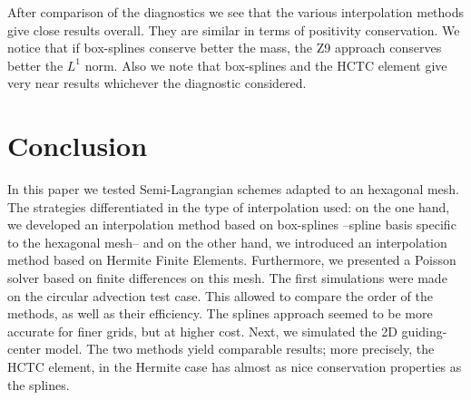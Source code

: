 \documentclass[proc]{edpsmath}
\begin{document}
After comparison of the diagnostics we see that the various interpolation methods give close results overall. They are similar in terms of positivity conservation. We notice that if box-splines conserve better the mass, the Z9 approach conserves better the $L^1$ norm. Also we note that box-splines and the HCTC element give very near results whichever the diagnostic considered.  


\section{Conclusion}
\label{sec:conclusion}
In this paper we tested  Semi-Lagrangian schemes adapted to an hexagonal mesh. The strategies differentiated in the type of interpolation used: on the one hand, we developed an interpolation method based on box-splines --spline basis specific to the hexagonal mesh-- and on the other hand, we introduced an interpolation method based on Hermite Finite Elements. Furthermore, we presented a Poisson solver based on finite differences on this mesh. The first simulations were made on the circular advection test case. This allowed to compare the order of the methods, as well as their efficiency. The splines approach seemed to be more accurate for finer grids, but at higher cost. Next, we simulated the 2D guiding-center model. The two methods yield comparable results; more precisely, the  HCTC element, in the Hermite case has almost as nice conservation properties as the splines.





\end{document}
